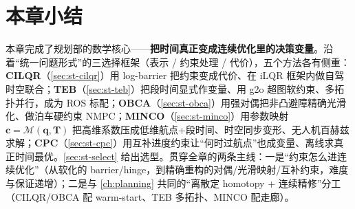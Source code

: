 \section*{本章小结}

本章完成了规划部的数学核心——\textbf{把时间真正变成连续优化里的决策变量}。沿着“统一问题形式”的三选择框架（表示 / 约束处理 / 代价），五个方法各有侧重：\textbf{CILQR}（\cref{sec:st-cilqr}）用 log-barrier 把约束变成代价、在 iLQR 框架内做自驾时空联合；\textbf{TEB}（\cref{sec:st-teb}）把段时间显式作变量、用 g2o 超图软约束、多拓扑并行，成为 ROS 标配；\textbf{OBCA}（\cref{sec:st-obca}）用强对偶把非凸避障精确光滑化、做泊车硬约束 NMPC；\textbf{MINCO}（\cref{sec:st-minco}）用参数映射 $\mathbf c=\mathcal M(\mathbf q,\mathbf T)$ 把高维系数压成低维航点+段时间、时空同步变形、无人机百赫兹求解；\textbf{CPC}（\cref{sec:st-cpc}）用互补进度约束让“何时过航点”也成变量、离线求真正时间最优。\cref{sec:st-select} 给出选型。贯穿全章的两条主线：一是“约束怎么进连续优化”（从软化的 barrier/hinge，到精确重构的对偶/光滑映射/互补约束，难度与保证递增）；二是与 \cref{ch:planning} 共同的“离散定 homotopy + 连续精修”分工（CILQR/OBCA 配 warm-start、TEB 多拓扑、MINCO 配走廊）。


